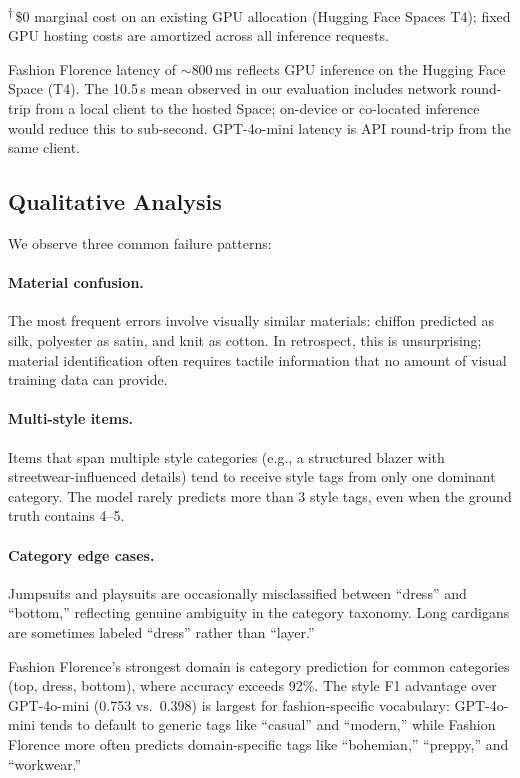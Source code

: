 \documentclass[10pt,twocolumn]{article}
\begin{document}
\noindent\textsuperscript{$\dagger$}\,\$0 marginal cost on an existing GPU
allocation (Hugging Face Spaces T4); fixed GPU hosting costs are amortized
across all inference requests.

Fashion Florence latency of $\sim$800\,ms reflects GPU inference
on the Hugging Face Space (T4).  The 10.5\,s mean observed in our
evaluation includes network round-trip from a local client to the hosted
Space; on-device or co-located inference would reduce this to sub-second.
GPT-4o-mini latency is API round-trip from the same client.

\subsection{Qualitative Analysis}

We observe three common failure patterns:

\paragraph{Material confusion.}
The most frequent errors involve visually similar materials: chiffon
predicted as silk, polyester as satin, and knit as cotton.  In retrospect,
this is unsurprising; material identification often requires tactile
information that no amount of visual training data can provide.

\paragraph{Multi-style items.}
Items that span multiple style categories (e.g., a structured blazer with
streetwear-influenced details) tend to receive style tags from only one
dominant category.  The model rarely predicts more than 3 style tags, even
when the ground truth contains 4--5.

\paragraph{Category edge cases.}
Jumpsuits and playsuits are occasionally misclassified between ``dress'' and
``bottom,'' reflecting genuine ambiguity in the category taxonomy.  Long
cardigans are sometimes labeled ``dress'' rather than ``layer.''

\noindent Fashion Florence's strongest domain is category prediction for
common categories (top, dress, bottom), where accuracy exceeds 92\%.  The
style F1 advantage over GPT-4o-mini (0.753 vs.\ 0.398) is largest for
fashion-specific vocabulary: GPT-4o-mini tends to default to generic tags
like ``casual'' and ``modern,'' while Fashion Florence more often predicts
domain-specific tags like ``bohemian,'' ``preppy,'' and ``workwear.''
\end{document}
